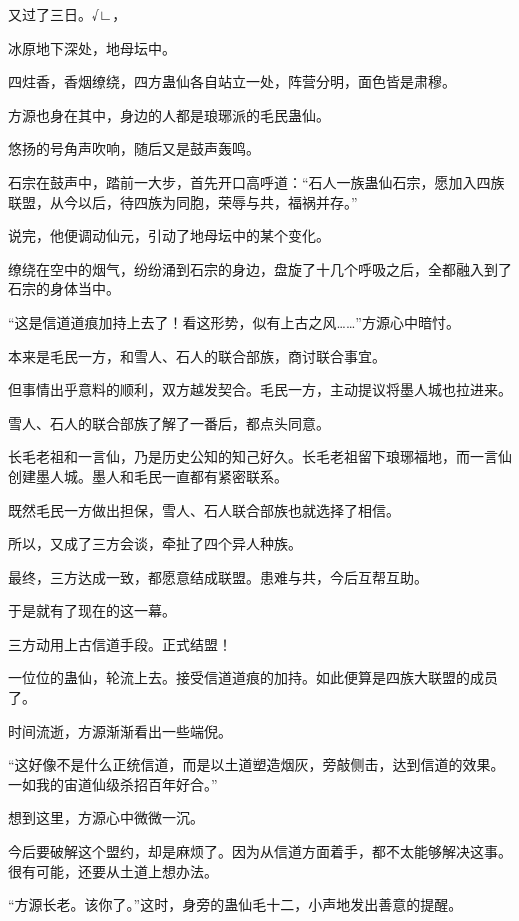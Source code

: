 
\begin{this_body}

又过了三日。√∟，

冰原地下深处，地母坛中。

四炷香，香烟缭绕，四方蛊仙各自站立一处，阵营分明，面色皆是肃穆。

方源也身在其中，身边的人都是琅琊派的毛民蛊仙。

悠扬的号角声吹响，随后又是鼓声轰鸣。

石宗在鼓声中，踏前一大步，首先开口高呼道：“石人一族蛊仙石宗，愿加入四族联盟，从今以后，待四族为同胞，荣辱与共，福祸并存。”

说完，他便调动仙元，引动了地母坛中的某个变化。

缭绕在空中的烟气，纷纷涌到石宗的身边，盘旋了十几个呼吸之后，全都融入到了石宗的身体当中。

“这是信道道痕加持上去了！看这形势，似有上古之风……”方源心中暗忖。

本来是毛民一方，和雪人、石人的联合部族，商讨联合事宜。

但事情出乎意料的顺利，双方越发契合。毛民一方，主动提议将墨人城也拉进来。

雪人、石人的联合部族了解了一番后，都点头同意。

长毛老祖和一言仙，乃是历史公知的知己好久。长毛老祖留下琅琊福地，而一言仙创建墨人城。墨人和毛民一直都有紧密联系。

既然毛民一方做出担保，雪人、石人联合部族也就选择了相信。

所以，又成了三方会谈，牵扯了四个异人种族。

最终，三方达成一致，都愿意结成联盟。患难与共，今后互帮互助。

于是就有了现在的这一幕。

三方动用上古信道手段。正式结盟！

一位位的蛊仙，轮流上去。接受信道道痕的加持。如此便算是四族大联盟的成员了。

时间流逝，方源渐渐看出一些端倪。

“这好像不是什么正统信道，而是以土道塑造烟灰，旁敲侧击，达到信道的效果。一如我的宙道仙级杀招百年好合。”

想到这里，方源心中微微一沉。

今后要破解这个盟约，却是麻烦了。因为从信道方面着手，都不太能够解决这事。很有可能，还要从土道上想办法。

“方源长老。该你了。”这时，身旁的蛊仙毛十二，小声地发出善意的提醒。


\end{this_body}
